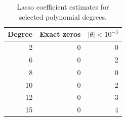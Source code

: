 \begin{table}[htbp]
    \centering
    \caption{Lasso coefficient estimates for selected polynomial degrees.}
    \label{tab:lasso-theta}
    \begin{tabular}{rrr}
        \hline\hline
        Degree & Exact zeros & $|\theta| < 10^{-3}$ \\
        \hline
        2      & 0           & 0                    \\
        6      & 0           & 2                    \\
        8      & 0           & 0                    \\
        10     & 0           & 2                    \\
        12     & 0           & 3                    \\
        15     & 0           & 4                    \\
        \hline\hline
    \end{tabular}
\end{table}
